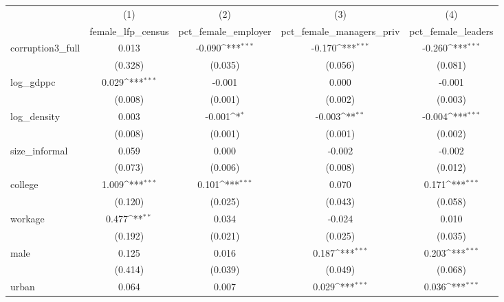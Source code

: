 {
\def\sym#1{\ifmmode^{#1}\else\(^{#1}\)\fi}
\begin{tabular}{l*{4}{c}}
\hline\hline
            &\multicolumn{1}{c}{(1)}&\multicolumn{1}{c}{(2)}&\multicolumn{1}{c}{(3)}&\multicolumn{1}{c}{(4)}\\
            &\multicolumn{1}{c}{female\_lfp\_census}&\multicolumn{1}{c}{pct\_female\_employer}&\multicolumn{1}{c}{pct\_female\_managers\_priv}&\multicolumn{1}{c}{pct\_female\_leaders}\\
\hline
corruption3\_full&       0.013         &      -0.090\sym{***}&      -0.170\sym{***}&      -0.260\sym{***}\\
            &     (0.328)         &     (0.035)         &     (0.056)         &     (0.081)         \\
[1em]
log\_gdppc   &       0.029\sym{***}&      -0.001         &       0.000         &      -0.001         \\
            &     (0.008)         &     (0.001)         &     (0.002)         &     (0.003)         \\
[1em]
log\_density &       0.003         &      -0.001\sym{*}  &      -0.003\sym{**} &      -0.004\sym{***}\\
            &     (0.008)         &     (0.001)         &     (0.001)         &     (0.002)         \\
[1em]
size\_informal&       0.059         &       0.000         &      -0.002         &      -0.002         \\
            &     (0.073)         &     (0.006)         &     (0.008)         &     (0.012)         \\
[1em]
college     &       1.009\sym{***}&       0.101\sym{***}&       0.070         &       0.171\sym{***}\\
            &     (0.120)         &     (0.025)         &     (0.043)         &     (0.058)         \\
[1em]
workage     &       0.477\sym{**} &       0.034         &      -0.024         &       0.010         \\
            &     (0.192)         &     (0.021)         &     (0.025)         &     (0.035)         \\
[1em]
male        &       0.125         &       0.016         &       0.187\sym{***}&       0.203\sym{***}\\
            &     (0.414)         &     (0.039)         &     (0.049)         &     (0.068)         \\
[1em]
urban       &       0.064         &       0.007         &       0.029\sym{***}&       0.036\sym{***}\\

\end{tabular}}
